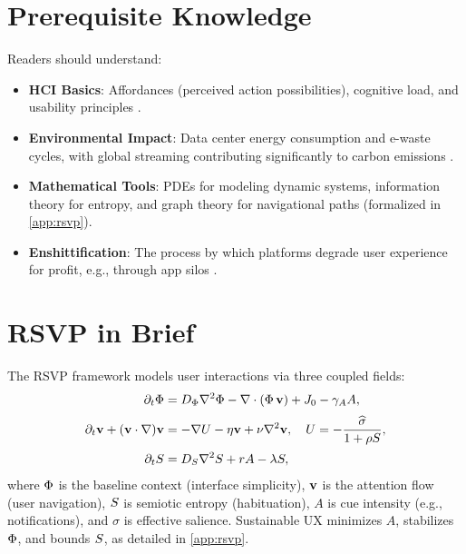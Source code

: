 \section{Prerequisite Knowledge}
Readers should understand:
\begin{itemize}
  \item \textbf{HCI Basics}: Affordances (perceived action possibilities), cognitive load, and usability principles \citep{norman1988}.
  \item \textbf{Environmental Impact}: Data center energy consumption and e-waste cycles, with global streaming contributing significantly to carbon emissions \citep{extentia2024}.
  \item \textbf{Mathematical Tools}: PDEs for modeling dynamic systems, information theory for entropy, and graph theory for navigational paths (formalized in \cref{app:rsvp}).
  \item \textbf{Enshittification}: The process by which platforms degrade user experience for profit, e.g., through app silos \citep{doctorow2022}.
\end{itemize}

\section{RSVP in Brief}
\label{sec:intro-rsvp}
The RSVP framework models user interactions via three coupled fields:
\begin{align}
\partial_t \Phi &= D_\Phi \nabla^2 \Phi - \nabla \cdot (\Phi\,\mathbf{v}) + J_0 - \gamma_A A, \label{eq:intro-phi}\\[2pt]
\partial_t \mathbf{v} + (\mathbf{v} \cdot \nabla)\mathbf{v} &= -\nabla U - \eta \mathbf{v} + \nu\nabla^2\mathbf{v}, \quad U=-\frac{\widehat{\sigma}}{1+\rho S}, \label{eq:intro-v}\\[2pt]
\partial_t S &= D_S \nabla^2 S + r A - \lambda S, \label{eq:intro-S}
\end{align}
where \(\Phi\) is the baseline context (interface simplicity), \(\mathbf{v}\) is the attention flow (user navigation), \(S\) is semiotic entropy (habituation), \(A\) is cue intensity (e.g., notifications), and \(\widehat{\sigma}\) is effective salience. Sustainable UX minimizes \(A\), stabilizes \(\Phi\), and bounds \(S\), as detailed in \cref{app:rsvp}.


